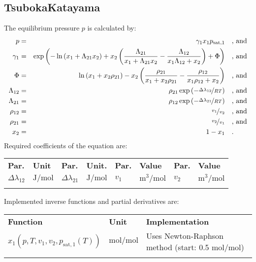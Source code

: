 \subsection{TsubokaKatayama}
\label{cha:approaches:abs:act:tsuboka_katayama}
%
The equilibrium pressure $p$ is calculated by:
%
\begin{equation*}
	\begin{split}
		p &=& \gamma_1 x_1 p_\mathrm{sat,1} & \quad\text{, and} \\
		\gamma_1 &=& \exp \left( - \ln \left( x_1 + \Lambda_{21} x_2 \right) + x_2 \left( \frac{\Lambda_{21}}{x_1 + \Lambda_{21} x_2} - \frac{\Lambda_{12}}{x_1 \Lambda_{12} + x_2} \right) + \Phi \right) & \quad\text{, and} \\
		\Phi &=& \ln \left( x_1 + x_2 \rho_{21} \right) - x_2 \left( \frac{\rho_{21}}{x_1 + x_2 \rho_{21}} - \frac{\rho_{12}}{x_1 \rho_{12} + x_2} \right) & \quad\text{, and} \\
		\Lambda_{12} &=& \rho_{21} \exp \left( - \nicefrac{\Delta\lambda_{12}}{R T} \right) & \quad\text{, and} \\
		\Lambda_{21} &=& \rho_{12} \exp \left( - \nicefrac{\Delta\lambda_{21}}{R T} \right) & \quad\text{, and} \\
		\rho_{12} &=& \nicefrac{v_1}{v_2} & \quad\text{, and} \\
		\rho_{21} &=& \nicefrac{v_2}{v_1} & \quad\text{, and} \\
		x_2 &=& 1 - x_1  & \quad\text{.} \\
	\end{split}
\end{equation*}
%
Required coefficients of the equation are:
%
\begin{longtable}[l]{ll|ll|ll|ll}
\toprule
\addlinespace
\textbf{Par.} & \textbf{Unit} & \textbf{Par.} &	\textbf{Unit.} & \textbf{Par.} & \textbf{Value} & \textbf{Par.} & \textbf{Value} \\
\addlinespace
\midrule
\endhead

\bottomrule
\endfoot
\bottomrule
\endlastfoot
\addlinespace

$\Delta\lambda_{12}$ & $\si{\joule\per\mole}$ &$\Delta\lambda_{21}$ & $\si{\joule\per\mole}$ & $v_1$ & $\si{\cubic\meter\per\mole}$& $v_2$ & $\si{\cubic\meter\per\mole}$ \\

\addlinespace
\end{longtable}
%
Implemented inverse functions and partial derivatives are:
%
\begin{longtable}[l]{l|l|p{7.5cm}}
	\toprule
	\addlinespace
	\textbf{Function} & \textbf{Unit} &	\textbf{Implementation} \\
	\addlinespace
	\midrule
	\endhead
	
	\bottomrule
	\endfoot
	\bottomrule
	\endlastfoot
	\addlinespace
	
	$x_1(p,T,v_1,v_2,p_\mathrm{sat,1}(T))$& $\si{\mole\per\mole}$ & Uses Newton-Raphson method (start: 0.5 $\si{\mole\per\mole}$) \\
	
	\addlinespace
\end{longtable}
